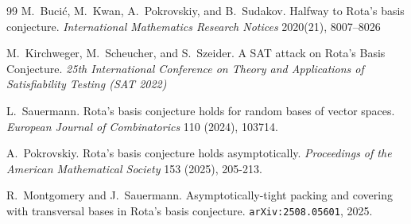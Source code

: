 \documentclass[11pt]{amsart}
\begin{document}
\begin{thebibliography}{99}
M.~Buci\'c, M.~Kwan, A.~Pokrovskiy, and B.~Sudakov.
\newblock Halfway to Rota's basis conjecture.
\newblock \emph{International Mathematics Research Notices} 2020(21), 8007–8026

M.~Kirchweger, M.~Scheucher, and S.~Szeider.
\newblock A SAT attack on Rota's Basis Conjecture.
\newblock \emph{25th International Conference on Theory and Applications of Satisfiability Testing (SAT 2022)}

L.~Sauermann.
\newblock Rota's basis conjecture holds for random bases of vector spaces.
\newblock \emph{European Journal of Combinatorics} 110 (2024), 103714.

A.~Pokrovskiy.
\newblock Rota's basis conjecture holds asymptotically.
\newblock \emph{Proceedings of the American Mathematical Society} 153 (2025), 205-213.

R.~Montgomery and J.~Sauermann.
\newblock Asymptotically-tight packing and covering with transversal bases in Rota's basis conjecture.
\newblock \texttt{arXiv:2508.05601}, 2025.

\end{thebibliography}
\end{document}
